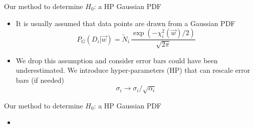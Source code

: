 \documentclass{beamer}
\begin{document}
\begin{frame}{Our method to determine $H_0$: a HP Gaussian PDF}

\begin{itemize}
\item It is usually assumed that data points are drawn from a Gaussian PDF
\begin{equation*}
P_G(D_i|\vec{w}) = \tilde{N}_i \, \frac{\exp(-\chi^2_i(\vec{w})/2)}{\sqrt{2\pi}}
\end{equation*}
\item We drop this assumption and consider error bars could have been underestimated. We introduce hyper-parameters (HP) that can rescale error bars (if needed) 
\begin{equation*}
\sigma_i \rightarrow \sigma_i/\sqrt{\alpha_i}
\end{equation*}
\end{itemize}
\end{frame}

\begin{frame}{Our method to determine $H_0$: a HP Gaussian PDF}
\begin{itemize}
\item[]
\end{itemize}
\end{frame}
\end{document}
